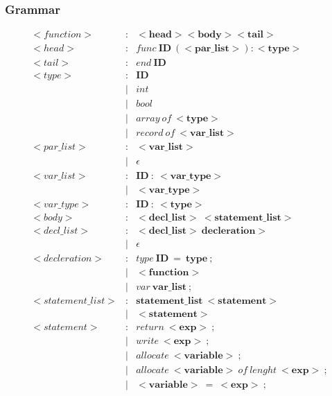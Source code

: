 \documentclass{article}
\begin{document}
\subsubsection*{Grammar}
\begin{align*}
    <function> 	&:	&<\boldsymbol{head}><\boldsymbol{body}><\boldsymbol{tail}> \\
    <head>&: &func\ \boldsymbol{ID}\ (<\boldsymbol{par\_list}>):<\boldsymbol{type}> \\
    <tail> &: & end\ \boldsymbol{ID} \\
    <type>&: &\boldsymbol{ID} \\
    & |& int \\
    & |& bool\\
    & |& array\ of\ <\boldsymbol{type}>\\
    & |& record\ of\ <\boldsymbol{var\_list}> \\
    <par\_list> &: & <\boldsymbol{var\_list}> \\
    &| & \epsilon \\
    <var\_list> & : & \boldsymbol{ID}\ :\ <\boldsymbol{var\_type}> \\
    & |& <\boldsymbol{var\_type}> \\ 
    <var\_type> & : & \boldsymbol{ID}\ :\ <\boldsymbol{type}> \\
    <body> & : & <\boldsymbol{decl\_list}> \ <\boldsymbol{statement\_list}> \\
    <decl\_list> & : & <\boldsymbol{decl\_list}>\ \boldsymbol{decleration}> \\
    & | & \epsilon \\ 
    <decleration> & : & type\ \boldsymbol{ID}\ = \ \boldsymbol{type}\ ; \\
    & | & <\boldsymbol{function}> \\
    & | & var\ \boldsymbol{var\_list}\ ; \\
    <statement\_list> & : & \boldsymbol{statement\_list}\ <\boldsymbol{statement}> \\
    & | & <\boldsymbol{statement}> \\
    <statement> & : & return\ <\boldsymbol{exp}>\ ; \\
    & | & write\ <\boldsymbol{exp}>\ ;  \\
    & | & allocate\ <\boldsymbol{variable}>\ ; \\
    & | & allocate\ <\boldsymbol{variable}>\ of\ lenght\ <\boldsymbol{exp}>\ ; \\
    & | & <\boldsymbol{variable}>\ =\ <\boldsymbol{exp}>\ ; \\

\end{align*}
\end{document}
